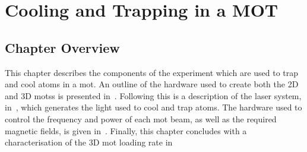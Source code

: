 \chapter{Cooling and Trapping in a MOT}\label{chap:mot}
\section{Chapter Overview}
This chapter describes the components of the experiment which
are used to trap and cool atoms in a \ac{mot}. An outline of the hardware used
to create both the 2D and 3D \acp{mots} is presented
in~. Following this is a description of the
\Muquans laser system, in~, which generates the
light used to cool and trap atoms. The hardware used to control the frequency
and power of each \ac{mot} beam, as well as the required magnetic fields, is
given in~. Finally, this chapter concludes with a
characterisation of the 3D \ac{mot} loading rate in~
